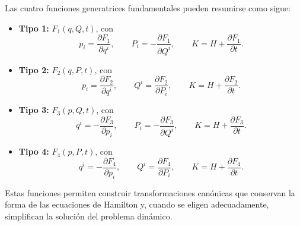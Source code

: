 \documentclass[../apunte_mecanica_clasica.tex]{subfiles}
\begin{document}
Las cuatro funciones generatrices fundamentales pueden resumirse como sigue:
\begin{itemize}
    \item \textbf{Tipo 1:} \(F_1(q,Q,t)\), con
    \begin{equation}
        p_i=\frac{\partial F_1}{\partial q^i},
        \qquad
        P_i=-\frac{\partial F_1}{\partial Q^i},
        \qquad
        K=H+\frac{\partial F_1}{\partial t}.
        \label{eq:tc-resumen-F1}
    \end{equation}

    \item \textbf{Tipo 2:} \(F_2(q,P,t)\), con
    \begin{equation}
        p_i=\frac{\partial F_2}{\partial q^i},
        \qquad
        Q^i=\frac{\partial F_2}{\partial P_i},
        \qquad
        K=H+\frac{\partial F_2}{\partial t}.
        \label{eq:tc-resumen-F2}
    \end{equation}

    \item \textbf{Tipo 3:} \(F_3(p,Q,t)\), con
    \begin{equation}
        q^i=-\frac{\partial F_3}{\partial p_i},
        \qquad
        P_i=-\frac{\partial F_3}{\partial Q^i},
        \qquad
        K=H+\frac{\partial F_3}{\partial t}.
        \label{eq:tc-resumen-F3}
    \end{equation}

    \item \textbf{Tipo 4:} \(F_4(p,P,t)\), con
    \begin{equation}
        q^i=-\frac{\partial F_4}{\partial p_i},
        \qquad
        Q^i=\frac{\partial F_4}{\partial P_i},
        \qquad
        K=H+\frac{\partial F_4}{\partial t}.
        \label{eq:tc-resumen-F4}
    \end{equation}
\end{itemize}

Estas funciones permiten construir transformaciones canónicas que conservan la forma de las ecuaciones de Hamilton y, cuando se eligen adecuadamente, simplifican la solución del problema dinámico.
\end{document}
